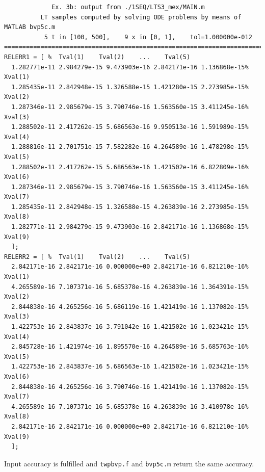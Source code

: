 \documentclass[a4paper,10pt]{report}%
\begin{document}
\begin{lstlisting}
             Ex. 3b: output from ./1SEQ/LTS3_mex/MAIN.m
          LT samples computed by solving ODE problems by means of MATLAB bvp5c.m
           5 t in [100, 500],    9 x in [0, 1],    tol=1.000000e-012
====================================================================================
RELERR1 = [ %  Tval(1)    Tval(2)    ...    Tval(5)
  1.282771e-11 2.984279e-15 9.473903e-16 2.842171e-16 1.136868e-15% Xval(1)
  1.285435e-11 2.842948e-15 1.326588e-15 1.421280e-15 2.273985e-15% Xval(2)
  1.287346e-11 2.985679e-15 3.790746e-16 1.563560e-15 3.411245e-16% Xval(3)
  1.288502e-11 2.417262e-15 5.686563e-16 9.950513e-16 1.591989e-15% Xval(4)
  1.288816e-11 2.701751e-15 7.582282e-16 4.264589e-16 1.478298e-15% Xval(5)
  1.288502e-11 2.417262e-15 5.686563e-16 1.421502e-16 6.822809e-16% Xval(6)
  1.287346e-11 2.985679e-15 3.790746e-16 1.563560e-15 3.411245e-16% Xval(7)
  1.285435e-11 2.842948e-15 1.326588e-15 4.263839e-16 2.273985e-15% Xval(8)
  1.282771e-11 2.984279e-15 9.473903e-16 2.842171e-16 1.136868e-15% Xval(9)
  ];
RELERR2 = [ %  Tval(1)    Tval(2)    ...    Tval(5)
  2.842171e-16 2.842171e-16 0.000000e+00 2.842171e-16 6.821210e-16% Xval(1)
  4.265589e-16 7.107371e-16 5.685378e-16 4.263839e-16 1.364391e-15% Xval(2)
  2.844838e-16 4.265256e-16 5.686119e-16 1.421419e-16 1.137082e-15% Xval(3)
  1.422753e-16 2.843837e-16 3.791042e-16 1.421502e-16 1.023421e-15% Xval(4)
  2.845728e-16 1.421974e-16 1.895570e-16 4.264589e-16 5.685763e-16% Xval(5)
  1.422753e-16 2.843837e-16 5.686563e-16 1.421502e-16 1.023421e-15% Xval(6)
  2.844838e-16 4.265256e-16 3.790746e-16 1.421419e-16 1.137082e-15% Xval(7)
  4.265589e-16 7.107371e-16 5.685378e-16 4.263839e-16 3.410978e-16% Xval(8)
  2.842171e-16 2.842171e-16 0.000000e+00 2.842171e-16 6.821210e-16% Xval(9)
  ];
\end{lstlisting}
Input accuracy is fulfilled and {\tt twpbvp.f} and {\tt bvp5c.m} return the same accuracy.
\end{document}
